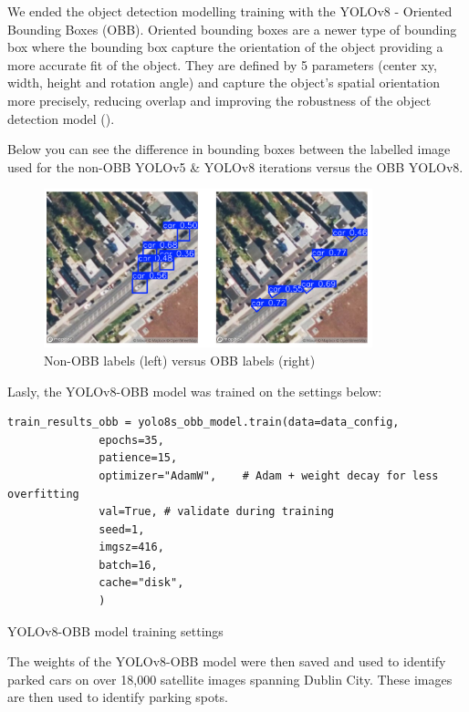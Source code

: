 We ended the object detection modelling training with the YOLOv8 - Oriented
Bounding Boxes (OBB).
Oriented bounding boxes are a newer type of bounding box where the bounding box
capture the orientation of the object providing a more accurate fit of the
object. They are defined by 5 parameters (center xy, width, height and rotation
angle) and capture the object's spatial orientation more precisely, reducing
overlap and improving the robustness of the object detection model
(\cite{obblit}).

\newpage{}
Below you can see the difference in bounding boxes between the labelled image
used for the non-OBB YOLOv5 \& YOLOv8 iterations versus the OBB YOLOv8.

\begin{figure}[htbp]
  \centering
  \includegraphics[width=0.85\textwidth]{images/obb-vs-nonobb-img.png}
  \caption{Non-OBB labels (left) versus OBB labels (right)}
\end{figure}

Lasly, the YOLOv8-OBB model was trained on the settings below:

\begin{listing}[htbp]
  \centering
  \begin{verbatim}
train_results_obb = yolo8s_obb_model.train(data=data_config,
              epochs=35,
              patience=15,
              optimizer="AdamW",    # Adam + weight decay for less overfitting
              val=True, # validate during training
              seed=1,
              imgsz=416,
              batch=16,
              cache="disk",
              )
  \end{verbatim}
  \caption{YOLOv8-OBB model training settings}
\end{listing}

The weights of the YOLOv8-OBB model were then saved and used to identify parked
cars on over 18,000 satellite images spanning Dublin City. These images are then
used to identify parking spots.

